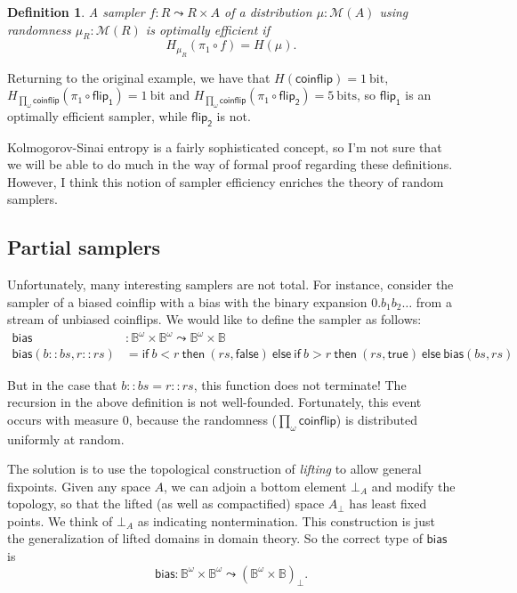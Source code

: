 \documentclass{article}           %
\newtheorem{definition}{Definition}
\newcommand{\Dist}[1]{\mathcal{M}({#1})}
\newcommand{\coinflip}{\mathsf{coinflip}}
\newcommand{\bool}{\mathbb{B}}
\newcommand{\cons}{::}
\newcommand{\un}[1]{\ \mathrm{#1}}
\begin{document}
\begin{definition}
A sampler $f : R \leadsto R \times A$ of a distribution $\mu : \Dist{A}$ using randomness $\mu_R : \Dist{R}$ is \emph{optimally efficient} if
\[
H_{\mu_R}(\pi_1 \circ f) = H(\mu).
\]
\end{definition}

Returning to the original example, we have that $H(\coinflip) = 1\un{bit}$, $H_{\prod_\omega \coinflip}(\pi_1 \circ \mathsf{flip_1}) = 1 \un{bit}$ and $H_{\prod_\omega \coinflip}(\pi_1 \circ \mathsf{flip_2}) = 5 \un{bits}$, so $\mathsf{flip_1}$ is an optimally efficient sampler, while $\mathsf{flip_2}$ is not.

Kolmogorov-Sinai entropy is a fairly sophisticated concept, so I'm not sure that we will be able to do much in the way of formal proof regarding these definitions. However, I think this notion of sampler efficiency enriches the theory of random samplers.

\subsection{Partial samplers}

Unfortunately, many interesting samplers are not total. For instance, consider the sampler of a biased coinflip with a bias with the binary expansion $0.b_1 b_2 \ldots$ from a stream of unbiased coinflips. We would like to define the sampler as follows:
\begin{align*}
\mathsf{bias} &: \bool^\omega \times \bool^\omega \leadsto \bool^\omega \times \bool
\\ \mathsf{bias}(b \cons bs, r \cons rs) &= \mathsf{if}\ b < r\ \mathsf{then}\ (rs, \mathsf{false})
  \ \mathsf{else}\ \mathsf{if}\ b > r\ \mathsf{then}\ (rs, \mathsf{true})\ \mathsf{else}\ \mathsf{bias}(bs, rs)
\end{align*}

But in the case that $b \cons bs = r \cons rs$, this function does not terminate! The recursion in the above definition is not well-founded. Fortunately, this event occurs with measure 0, because the randomness ($\prod_\omega \coinflip$) is distributed uniformly at random.

The solution is to use the topological construction of \emph{lifting} to allow general fixpoints. Given any space $A$, we can adjoin a bottom element $\bot_A$ and modify the topology, so that the lifted (as well as compactified) space $A_\bot$ has least fixed points. We think of $\bot_A$ as indicating nontermination. This construction is just the generalization of lifted domains in domain theory. So the correct type of $\mathsf{bias}$ is
\[
\mathsf{bias} : \bool^\omega \times \bool^\omega \leadsto \left( \bool^\omega \times \bool \right)_\bot.
\]
\end{document}
